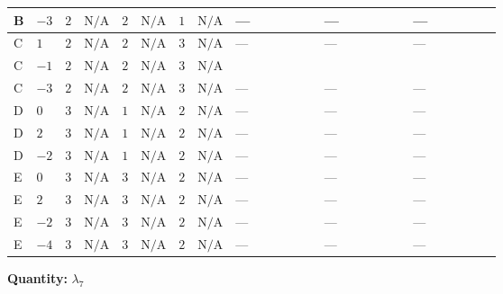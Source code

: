 \documentclass[8pt]{article}
\begin{document}
\begin{landscape}
\begin{longtable}{@{}llcccccc >{\raggedright\arraybackslash}p{0.21\linewidth} >{\raggedright\arraybackslash}p{0.21\linewidth} >{\raggedright\arraybackslash}p{0.21\linewidth}@{}}
\midrule
B & $-3$ & $2$ & $\text{N/A}$ & $2$ & $\text{N/A}$ & $1$ & $\text{N/A}$ & --- & --- & --- \\
\midrule
C & $1$ & $2$ & $\text{N/A}$ & $2$ & $\text{N/A}$ & $3$ & $\text{N/A}$ & --- & --- & --- \\
\midrule
C & $-1$ & $2$ & $\text{N/A}$ & $2$ & $\text{N/A}$ & $3$ & $\text{N/A}$ & \scriptsize\adjustbox{max width=\linewidth}{$\begin{gathered} {\lambda_{7}} (6 \operatorname{Tr}\!\left({Y_d}\,\left({Y_d}\right)^{\dagger}\right)+2 \operatorname{Tr}\!\left({Y_e}\,\left({Y_e}\right)^{\dagger}\right)+6 \operatorname{Tr}\!\left({Y_u}\,\left({Y_u}\right)^{\dagger}\right))\end{gathered}$} & \scriptsize\adjustbox{max width=\linewidth}{$\begin{gathered} -9 {g_2}^2 {\lambda_{7}}\end{gathered}$} & \scriptsize\adjustbox{max width=\linewidth}{$\begin{gathered} -3 {g_1}^2 {\lambda_{7}}\end{gathered}$} \\
\midrule
C & $-3$ & $2$ & $\text{N/A}$ & $2$ & $\text{N/A}$ & $3$ & $\text{N/A}$ & --- & --- & --- \\
\midrule
D & $0$ & $3$ & $\text{N/A}$ & $1$ & $\text{N/A}$ & $2$ & $\text{N/A}$ & --- & --- & --- \\
\midrule
D & $2$ & $3$ & $\text{N/A}$ & $1$ & $\text{N/A}$ & $2$ & $\text{N/A}$ & --- & --- & --- \\
\midrule
D & $-2$ & $3$ & $\text{N/A}$ & $1$ & $\text{N/A}$ & $2$ & $\text{N/A}$ & --- & --- & --- \\
\midrule
E & $0$ & $3$ & $\text{N/A}$ & $3$ & $\text{N/A}$ & $2$ & $\text{N/A}$ & --- & --- & --- \\
\midrule
E & $2$ & $3$ & $\text{N/A}$ & $3$ & $\text{N/A}$ & $2$ & $\text{N/A}$ & --- & --- & --- \\
\midrule
E & $-2$ & $3$ & $\text{N/A}$ & $3$ & $\text{N/A}$ & $2$ & $\text{N/A}$ & --- & --- & --- \\
\midrule
E & $-4$ & $3$ & $\text{N/A}$ & $3$ & $\text{N/A}$ & $2$ & $\text{N/A}$ & --- & --- & --- \\
\midrule
\bottomrule
\end{longtable}
\clearpage
\noindent\textbf{Quantity: }$\lambda_{7}$\par\smallskip

\end{landscape}
\end{document}

